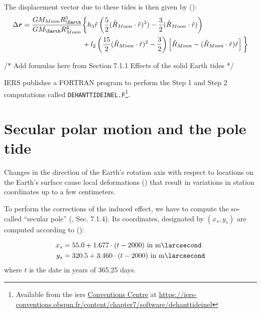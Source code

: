 The displacement vector due to these tides is then given by (\cite{iers2010}):
\begin{equation}
  \begin{aligned}
  \Delta \bm{r} = \frac{GM_{Moon} R^5_{\Earth}}{GM_{\Earth}R^4_{Moon}} &
    \biggl\{ \loveh _3 \hat{r} \left( \frac{5}{2} (\hat{R}_{Moon} \cdot \hat{r})^3) -\frac{3}{2} (\hat{R}_{Moon} \cdot \hat{r}) \right) \\
      & + \lovel _2 \left( \frac{15}{2}(\hat{R}_{Moon} \cdot \hat{r})^2 - \frac{3}{2}\right) \left[ \hat{R}_{Moon} - (\hat{R}_{Moon} \cdot \hat{r}) \hat{r} \right] 
    \biggl\}
    \end{aligned}
    \label{eq:iers106}
\end{equation}

/* Add formulas here from Section 7.1.1 Effects of the solid Earth tides */

\gls{IERS} publishes a FORTRAN program to perform the Step 1 and Step 2 computations 
called \texttt{DEHANTTIDEINEL.F}\footnote{Available from the \gls{iers} \href{https://iers-conventions.obspm.fr/}{Conventions Centre} at \url{https://iers-conventions.obspm.fr/content/chapter7/software/dehanttideinel}}.

\section{Secular polar motion and the pole tide}
\label{sec:pole-tides}

Changes in the direction of the Earth's rotation axis with respect to locations 
on the Earth's surface cause local deformations (\cite{Desai2002}) that result in 
variations in station coordinates up to a few centimeters.

To perform the corrections of the induced effect, we have to compute the so-called 
``secular pole'' (\cite{iers2010}, Sec. 7.1.4). Its coordinates, designated by 
$(x_s, y_s)$ are computed according to (\cite{iers2010}):

\begin{equation}
  \begin{aligned}
    x_s &= 55.0 + 1.677 \cdot (t-2000) \text{ in } \si{\milli\larcsecond} \\
    y_s &=  320.5 + 3.460 \cdot (t-2000) \text{ in } \si{\milli\larcsecond}
  \end{aligned}
\end{equation}
where $t$ is the date in years of 365.25 days.
